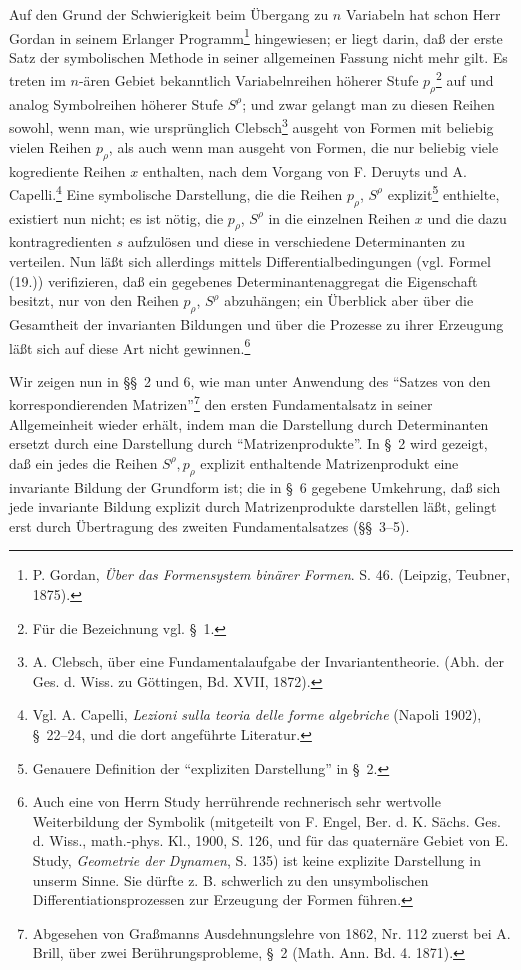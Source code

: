\documentclass[11pt]{article}
\begin{document}
Auf den Grund der Schwierigkeit beim Übergang zu $n$ Variabeln hat schon Herr Gordan in seinem Erlanger Programm\footnote{P. Gordan, \emph{Über das Formensystem binärer Formen}. S. 46. (Leipzig, Teubner, 1875).} hingewiesen; er liegt darin, daß der erste Satz der symbolischen Methode in seiner allgemeinen Fassung nicht mehr gilt. Es treten im $n$-ären Gebiet bekanntlich Variabelnreihen höherer Stufe $p_\rho$\footnote{Für die Bezeichnung vgl. \S\ 1.} auf und analog Symbolreihen höherer Stufe $S^\rho$; und zwar gelangt man zu diesen Reihen sowohl, wenn man, wie ursprünglich Clebsch\footnote{A. Clebsch, über eine Fundamentalaufgabe der Invariantentheorie. (Abh. der Ges. d. Wiss. zu Göttingen, Bd. XVII, 1872).} ausgeht von Formen mit beliebig vielen Reihen $p_\rho$, als auch wenn man ausgeht von Formen, die nur beliebig viele kogrediente Reihen $x$ enthalten, nach dem Vorgang von F. Deruyts und A. Capelli.\footnote{Vgl. A. Capelli, \emph{Lezioni sulla teoria delle forme algebriche} (Napoli 1902), \S\ 22--24, und die dort angeführte Literatur.} Eine symbolische Darstellung, die die Reihen $p_\rho$, $S^\rho$ explizit\footnote{Genauere Definition der ``expliziten Darstellung'' in \S\ 2.} enthielte, existiert nun nicht; es ist nötig, die $p_\rho$, $S^\rho$ in die einzelnen Reihen $x$ und die dazu kontragredienten $s$ aufzulösen und diese in verschiedene Determinanten zu verteilen. Nun läßt sich allerdings mittels Differentialbedingungen (vgl. Formel (19.)) verifizieren, daß ein gegebenes Determinantenaggregat die Eigenschaft besitzt, nur von den Reihen $p_\rho$, $S^\rho$ abzuhängen; ein Überblick aber über die Gesamtheit der invarianten Bildungen und über die Prozesse zu ihrer Erzeugung läßt sich auf diese Art nicht gewinnen.\footnote{Auch eine von Herrn Study herrührende rechnerisch sehr wertvolle Weiterbildung der Symbolik (mitgeteilt von F. Engel, Ber. d. K. Sächs. Ges. d. Wiss., math.-phys. Kl., 1900, S. 126, und für das quaternäre Gebiet von E. Study, \emph{Geometrie der Dynamen}, S. 135) ist keine explizite Darstellung in unserm Sinne. Sie dürfte z. B. schwerlich zu den unsymbolischen Differentiationsprozessen zur Erzeugung der Formen führen.}

Wir zeigen nun in \S\S\ 2 und 6, wie man unter Anwendung des ``Satzes von den korrespondierenden Matrizen''\footnote{Abgesehen von Graßmanns Ausdehnungslehre von 1862, Nr. 112 zuerst bei A. Brill, über zwei Berührungsprobleme, \S\ 2 (Math. Ann. Bd. 4. 1871).} den ersten Fundamentalsatz in seiner Allgemeinheit wieder erhält, indem man die Darstellung durch Determinanten ersetzt durch eine Darstellung durch ``Matrizenprodukte''. In \S\ 2 wird gezeigt, daß ein jedes die Reihen $S^\rho,p_\rho$ explizit enthaltende Matrizenprodukt eine invariante Bildung der Grundform ist; die in \S\ 6 gegebene Umkehrung, daß sich jede invariante Bildung explizit durch Matrizenprodukte darstellen läßt, gelingt erst durch Übertragung des zweiten Fundamentalsatzes (\S\S\ 3--5).
\end{document}
